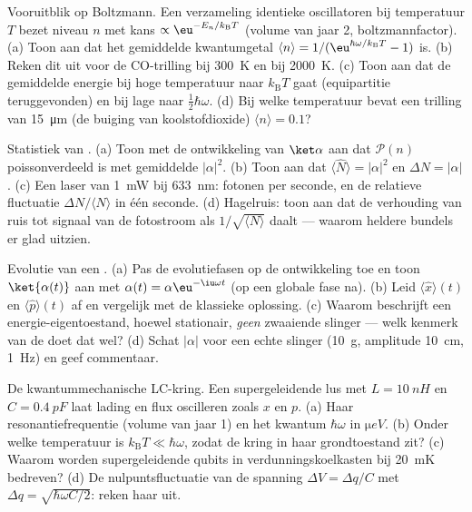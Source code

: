 \begin{exercise}[$\star\star$]\label{exo:b3:harmonic-oscillator:6}
Vooruitblik op Boltzmann. Een verzameling identieke oscillatoren bij
temperatuur $T$ bezet niveau $n$ met kans $\propto
\eu^{-E_n/k_{\text{B}}T}$ (volume van jaar 2, boltzmannfactor). (a) Toon
aan dat het gemiddelde kwantumgetal $\langle n\rangle =
1/(\eu^{\hbar\omega/k_{\text{B}}T} - 1)$ is. (b) Reken dit uit voor de
CO-trilling bij \qty{300}{K} en bij \qty{2000}{K}. (c) Toon aan dat de
gemiddelde energie bij hoge temperatuur naar $k_{\text{B}}T$ gaat
(equipartitie teruggevonden) en bij lage naar $\tfrac12\hbar\omega$. (d)
Bij welke temperatuur bevat een trilling van \qty{15}{\micro m} (de buiging
van koolstofdioxide) $\langle n\rangle = 0.1$?
\end{exercise}

\begin{exercise}[$\star\star$]\label{exo:b3:harmonic-oscillator:7}
Statistiek van . (a) Toon met de ontwikkeling van
$\ket\alpha$ aan dat $\mathcal P(n)$ poissonverdeeld is met gemiddelde
$|\alpha|^2$. (b) Toon aan dat $\langle\hat N\rangle = |\alpha|^2$ en
$\Delta N = |\alpha|$. (c) Een laser van \qty{1}{mW} bij \qty{633}{nm}:
fotonen per seconde, en de relatieve fluctuatie $\Delta N/\langle N\rangle$ in één seconde. (d) Hagelruis: toon aan dat de verhouding van
ruis tot signaal van de fotostroom als $1/\sqrt{\langle N\rangle}$ daalt
--- waarom heldere bundels er glad uitzien.
\end{exercise}

\begin{exercise}[$\star\star$]\label{exo:b3:harmonic-oscillator:8}
Evolutie van een . (a) Pas de evolutiefasen op de
ontwikkeling toe en toon $\ket{\alpha(t)}$ aan met $\alpha(t) =
\alpha\eu^{-\iu\omega t}$ (op een globale fase na). (b) Leid
$\langle\hat x\rangle(t)$ en $\langle\hat p\rangle(t)$ af en vergelijk met
de klassieke oplossing. (c) Waarom beschrijft een energie-eigentoestand,
hoewel stationair, \emph{geen} zwaaiende slinger --- welk kenmerk van de
 doet dat wel? (d) Schat $|\alpha|$ voor een echte
slinger (\qty{10}{g}, amplitude \qty{10}{cm}, \qty{1}{Hz}) en geef
commentaar.
\end{exercise}

\begin{exercise}[$\star\star$]\label{exo:b3:harmonic-oscillator:9}
De kwantummechanische LC-kring. Een supergeleidende lus met $L =
\qty{10}{nH}$ en $C = \qty{0.4}{pF}$ laat lading en flux oscilleren zoals
$x$ en $p$. (a) Haar resonantiefrequentie (volume van jaar 1) en het
kwantum $\hbar\omega$ in $\unit{\micro eV}$. (b) Onder welke temperatuur
is $k_{\text{B}}T \ll \hbar\omega$, zodat de kring in haar grondtoestand
zit? (c) Waarom worden supergeleidende qubits in verdunningskoelkasten bij
\qty{20}{mK} bedreven? (d) De nulpuntsfluctuatie van de spanning $\Delta V = \Delta q/C$ met $\Delta q =
\sqrt{\hbar\omega C/2}$: reken haar uit.
\end{exercise}


